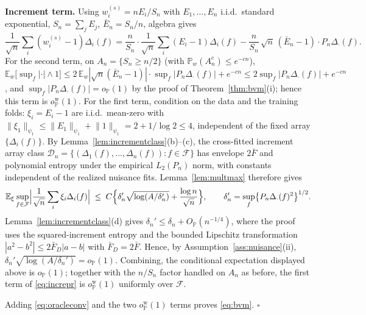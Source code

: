 \documentclass[11pt]{article}
\newcommand{\E}{\mathbb E}
\newcommand{\Pp}{\mathbb P}
\newcommand{\opro}{o_{\Pp}}
\newcommand{\Op}{O_{\Pp}}
\newcommand{\calD}{\mathcal D}
\newcommand{\calF}{\mathcal F}
\newcommand{\norm}[1]{\lVert #1\rVert}
\begin{document}
\textbf{Increment term.} Using $w^{(s)}_i=nE_i/S_n$ with $E_1,\dots,E_n$ i.i.d.\ standard exponential, $S_n=\sum_jE_j$, $\bar E_n=S_n/n$, algebra gives
\begin{equation}\label{eq:increpr}
\frac1{\sqrt n}\sum_i(w^{(s)}_i-1)\Delta_i(f)
=\frac{n}{S_n}\cdot\frac1{\sqrt n}\sum_i(E_i-1)\Delta_i(f)
-\frac{n}{S_n}\,\sqrt n\,(\bar E_n-1)\cdot P_n\Delta_\cdot(f).
\end{equation}
For the second term, on $A_n=\{S_n\ge n/2\}$ (with $\Pp_w(A_n^c)\le e^{-cn}$),
$\E_w\bigl[\sup_f|\cdot|\wedge1\bigr]\le2\,\E_w|\sqrt n(\bar E_n-1)|\cdot\sup_f|P_n\Delta_\cdot(f)|+e^{-cn}
\le2\sup_f|P_n\Delta_\cdot(f)|+e^{-cn}$,
and $\sup_f|P_n\Delta_\cdot(f)|=\opro(1)$ by the proof of Theorem~\ref{thm:bvm}\textup{(i)}; hence this term is $\opro^{\mathrm w}(1)$.
For the first term, condition on the data and the training folds: $\xi_i=E_i-1$ are i.i.d.\ mean-zero with $\norm{\xi_1}_{\psi_1}\le\norm{E_1}_{\psi_1}+\norm{1}_{\psi_1}=2+1/\log2\le4$, independent of the fixed array $\{\Delta_i(f)\}$. By Lemma~\ref{lem:incrementclass}\textup{(b)--(c)}, the cross-fitted increment array class $\calD_n=\{(\Delta_1(f),\dots,\Delta_n(f)):f\in\calF\}$ has envelope $2\bar F$ and polynomial entropy under the empirical $L_2(P_n)$ norm, with constants independent of the realized nuisance fits. Lemma~\ref{lem:multmax} therefore gives
\begin{equation*}
\E_\xi\sup_{f\in\calF}\Bigl|\frac1{\sqrt n}\sum_i\xi_i\Delta_i(f)\Bigr|
\;\le\;C\Bigl\{\delta_n'\sqrt{\log(A/\delta_n')}+\frac{\log n}{\sqrt n}\Bigr\},
\qquad
\delta_n'=\sup_f\bigl\{P_n\Delta_\cdot(f)^2\bigr\}^{1/2}.
\end{equation*}
Lemma~\ref{lem:incrementclass}\textup{(d)} gives $\delta_n'\le\delta_n+\Op(n^{-1/4})$, where the proof uses the squared-increment entropy and the bounded Lipschitz transformation $|a^2-b^2|\le 2\bar F_D|a-b|$ with $\bar F_D=2\bar F$. Hence, by Assumption~\ref{ass:nuisance}\textup{(ii)}, $\delta_n'\sqrt{\log(A/\delta_n')}=\opro(1)$. Combining, the conditional expectation displayed above is $\opro(1)$; together with the $n/S_n$ factor handled on $A_n$ as before, the first term of \eqref{eq:increpr} is $\opro^{\mathrm w}(1)$ uniformly over $\calF$.

Adding \eqref{eq:oracleconv} and the two $\opro^{\mathrm w}(1)$ terms proves \eqref{eq:bvm}. \hfill$\square$
\end{document}
